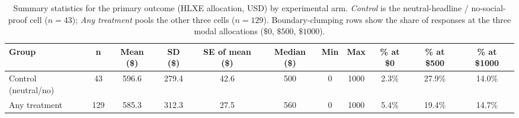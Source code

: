 \begin{table}[!htbp]
  \centering
  \begin{threeparttable}
  \caption{Summary statistics for the primary outcome (HLXE allocation, USD) by experimental arm. \textit{Control} is the neutral-headline / no-social-proof cell ($n=43$); \textit{Any treatment} pools the other three cells ($n=129$). Boundary-clumping rows show the share of responses at the three modal allocations ($\$0$, $\$500$, $\$1000$).}
  \label{tab:summary_arm}
  \begin{tabular}{lcccccccccc}
\toprule
Group & n & Mean (\$) & SD (\$) & SE of mean (\$) & Median (\$) & Min & Max & \% at \$0 & \% at \$500 & \% at \$1000 \\
\midrule
Control (neutral/no) & 43 & 596.6 & 279.4 & 42.6 & 500 & 0 & 1000 & 2.3\% & 27.9\% & 14.0\% \\
Any treatment & 129 & 585.3 & 312.3 & 27.5 & 560 & 0 & 1000 & 5.4\% & 19.4\% & 14.7\% \\
\bottomrule
\end{tabular}
  \end{threeparttable}
\end{table}
